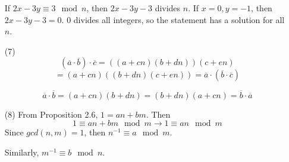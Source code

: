 \documentclass[12pt]{article}
\begin{document}
\begin{itemize}
If $2x - 3y \equiv 3 \mod n$, then $2x - 3y - 3$ divides $n$. If $x = 0, y = -1$, then $2x - 3y - 3 = 0$. 0 divides all integers, so the statement has a solution for all $n$.
\item[(7)]
$$(\overline{a}\cdot\overline{b})\cdot\overline{c} = ((a + cn)(b + dn))(c + en)$$
$$= (a + cn)((b + dn)(c + en)) = \overline{a}\cdot(\overline{b}\cdot\overline{c})$$

$$\overline{a}\cdot\overline{b} = (a + cn)(b + dn) = (b + dn)(a + cn) = \overline{b}\cdot\overline{a}$$
\item[(8)]
From Proposition 2.6, $1 = an + bm$. Then
$$1 \equiv an + bm \mod m \rightarrow 1 \equiv an \mod m$$
Since $gcd(n, m) = 1$, then $n^{-1} \equiv a \mod m$.

Similarly, $m^{-1} \equiv b \mod n$.
\end{itemize}
\end{document}
